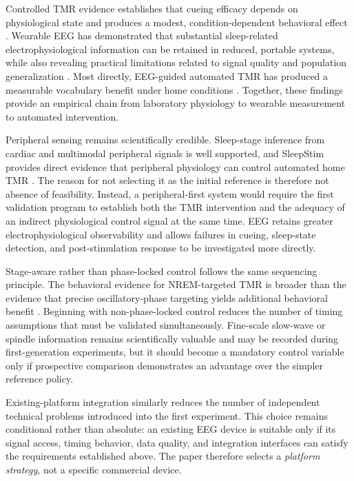 Controlled TMR evidence establishes that cueing efficacy depends on
physiological state and produces a modest, condition-dependent behavioral effect
\citep{hu2020promoting}. Wearable EEG has demonstrated that substantial
sleep-related electrophysiological information can be retained in reduced,
portable systems, while also revealing practical limitations related to signal
quality and population generalization
\citep{arnal2020dreem,ravindran2025dreem}. Most directly, EEG-guided automated
TMR has produced a measurable vocabulary benefit under home conditions
\citep{salfi2025promoting}. Together, these findings provide an empirical chain
from laboratory physiology to wearable measurement to automated intervention.

Peripheral sensing remains scientifically credible. Sleep-stage inference from
cardiac and multimodal peripheral signals is well supported, and SleepStim
provides direct evidence that peripheral physiology can control automated home
TMR \citep{korkalainen2020ppg,whitmore2022improving}. The reason for not
selecting it as the initial reference is therefore not absence of feasibility.
Instead, a peripheral-first system would require the first validation program
to establish both the TMR intervention and the adequacy of an indirect
physiological control signal at the same time. EEG retains greater
electrophysiological observability and allows failures in cueing, sleep-state
detection, and post-stimulation response to be investigated more directly.

Stage-aware rather than phase-locked control follows the same sequencing
principle. The behavioral evidence for NREM-targeted TMR is broader than the
evidence that precise oscillatory-phase targeting yields additional behavioral
benefit \citep{hu2020promoting}. Beginning with non-phase-locked control reduces
the number of timing assumptions that must be validated simultaneously.
Fine-scale slow-wave or spindle information remains scientifically valuable and
may be recorded during first-generation experiments, but it should become a
mandatory control variable only if prospective comparison demonstrates an
advantage over the simpler reference policy.

Existing-platform integration similarly reduces the number of independent
technical problems introduced into the first experiment. This choice remains
conditional rather than absolute: an existing EEG device is suitable only if
its signal access, timing behavior, data quality, and integration interfaces can
satisfy the requirements established above. The paper therefore selects a
\textit{platform strategy}, not a specific commercial device.

